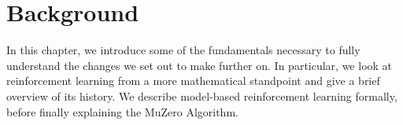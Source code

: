 \section{Background}
In this chapter, we introduce some of the fundamentals necessary to fully understand the changes we set out to make further on. In particular, we look at reinforcement learning from a more mathematical standpoint and give a brief overview of its history. We describe model-based reinforcement learning formally, before finally explaining the MuZero Algorithm.






